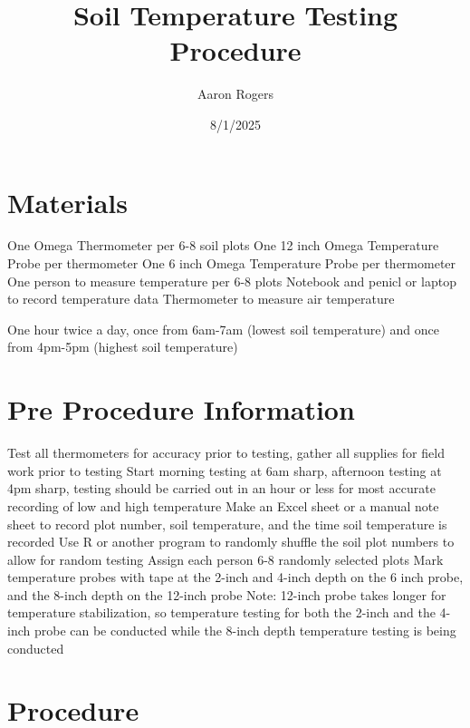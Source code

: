 \documentclass[12pt]{../SOP4_alpha}\usepackage[]{graphicx}\usepackage[]{xcolor}
\title{Soil Temperature Testing Procedure}
\date{8/1/2025}
\author{Aaron Rogers}
\begin{document}
\maketitle
\section{Materials}
\NP One Omega Thermometer per 6-8 soil plots
\NP One 12 inch Omega Temperature Probe per thermometer
\NP One 6 inch Omega Temperature Probe per thermometer
\NP One person to measure temperature per 6-8 plots 
\NP Notebook and penicl or laptop to record temperature data 
\NP Thermometer to measure air temperature


\NP One hour twice a day, once from 6am-7am (lowest soil temperature) and once from 4pm-5pm (highest soil temperature)


\section{Pre Procedure Information}
\NP Test all thermometers for accuracy prior to testing, gather all supplies for field work prior to testing
\NP Start morning testing at 6am sharp, afternoon testing at 4pm sharp, testing should be carried out in an hour or less for most accurate recording of low and high temperature
\NP Make an Excel sheet or a manual note sheet to record plot number, soil temperature, and the time soil temperature is recorded
\NP Use R or another program to randomly shuffle the soil plot numbers to allow for random testing
\NP Assign each person 6-8 randomly selected plots
\NP Mark temperature probes with tape at the 2-inch and 4-inch depth on the 6 inch probe, and the 8-inch depth on the 12-inch probe 
\NP Note: 12-inch probe takes longer for temperature stabilization, so temperature testing for both the 2-inch and the 4-inch probe can be conducted while the 8-inch depth temperature testing is being conducted  



\section{Procedure}
\end{document}
